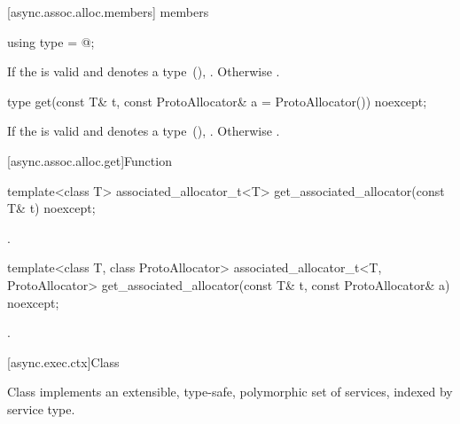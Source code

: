 [async.assoc.alloc.members]{ members}

\begin{itemdecl}
using type = @\seebelow@;
\end{itemdecl}

\begin{itemdescr}
\pnum
\ctype If the  
is valid and denotes a type~(), .
Otherwise .
\end{itemdescr}

\begin{itemdecl}
type get(const T& t, const ProtoAllocator& a = ProtoAllocator()) noexcept;
\end{itemdecl}

\begin{itemdescr}
\pnum
\returns If the  
is valid and denotes a type~(), .
Otherwise .
\end{itemdescr}



[async.assoc.alloc.get]{Function }

%
\begin{itemdecl}
template<class T>
  associated_allocator_t<T> get_associated_allocator(const T& t) noexcept;
\end{itemdecl}

\begin{itemdescr}
\pnum
\returns {}.
\end{itemdescr}

\begin{itemdecl}
template<class T, class ProtoAllocator>
  associated_allocator_t<T, ProtoAllocator>
    get_associated_allocator(const T& t, const ProtoAllocator& a) noexcept;
\end{itemdecl}

\begin{itemdescr}
\pnum
\returns {}.
\end{itemdescr}



[async.exec.ctx]{Class }

%
\pnum
Class  implements an extensible, type-safe, polymorphic set of services, indexed by service type.

